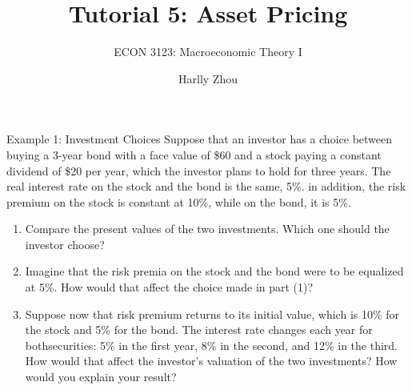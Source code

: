 \documentclass[xcolor=dvipsnames]{beamer}
\title[Measurment of Macroeconomy]{Tutorial 5: Asset Pricing}
\subtitle{ECON 3123: Macroeconomic Theory I}
\author[Harlly Zhou]{Harlly Zhou}
\institute[HKUST]{Department of Economics\\
HKUST Business School}
\date{}
\begin{document}
\begin{frame}
\titlepage
\end{frame}

\begin{frame}{Example 1: Investment Choices}
Suppose that an investor has a choice between buying a 3-year bond with a face value of \$60 and a stock paying a constant dividend of \$20 per year, which the investor plans to hold for three years. The real interest rate on the stock and the bond is the same, 5\%. in addition, the risk premium on the stock is constant at 10\%, while on the bond, it is 5\%.
\begin{enumerate}
    \item Compare the present values of the two investments. Which one should the investor choose?
    \item Imagine that the risk premia on the stock and the bond were to be equalized at 5\%. How would that affect the choice made in part (1)?
    \item Suppose now that risk premium returns to its initial value, which is 10\% for the stock and 5\% for the bond. The interest rate changes each year for bothsecurities: 5\% in the first year, 8\% in the second, and 12\% in the third. How would that affect the investor's valuation of the two investments? How would you explain your result?
\end{enumerate}
\end{frame}
\end{document}
